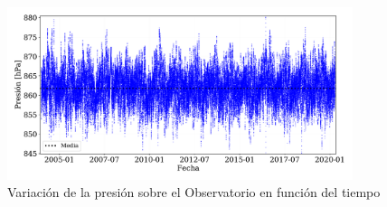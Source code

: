 \begin{figure}[H]
	\centering
		\includegraphics[width=0.9\textwidth]{Graphs/clima/presion.pdf}
	\caption{Variación de la presión sobre el Observatorio en función del tiempo}
  \label{fig:clima_p}
\end{figure}


